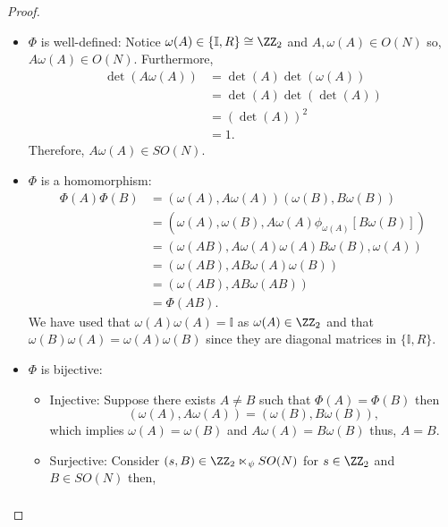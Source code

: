 \documentclass[12pt, a4paper]{article}
\begin{document}
\begin{proof}
\begin{enumerate}
\begin{itemize}
            \item \(\Phi\) is well-defined:
                    Notice \(\omega(A) \in \{\mathbb{I},R\} \cong \ZZ_2\) and \(A,\omega(A) \in O(N)\) so, \(A\omega(A) \in O(N)\). Furthermore, 
                    \[\begin{aligned}
                        \det(A\omega(A)) &= \det(A)\det(\omega(A)) \\
                        &= \det(A)\det(\det(A)) \\
                        &= (\det(A))^2 \\
                        &= 1.
                    \end{aligned}\]
                    Therefore, \(A\omega(A) \in SO(N)\).
            \item \(\Phi\) is a homomorphism:
                    \[\begin{aligned}
                        \Phi(A)\Phi(B) &=(\omega(A),A\omega(A))(\omega(B),B\omega(B)) \\
                        &= (\omega(A),\omega(B),A\omega(A)\phi_{\omega(A)}[B\omega(B)]) \\
                        &= (\omega(AB),A \omega(A)\omega(A)B\omega(B),\omega(A)) \\
                        &= (\omega(AB), AB \omega(A)\omega(B)) \\
                        &= (\omega(AB), AB\omega(AB)) \\
                        &= \Phi(AB).
                    \end{aligned}\]
                    We have used that \(\omega(A)\omega(A) = \mathbb{I}\) as \(\omega(A) \in \ZZ_2\) and that \(\omega(B)\omega(A)=\omega(A)\omega(B)\) since they are diagonal matrices in \(\{\mathbb{I},R\}\).
            \item \(\Phi\) is bijective:
                    \begin{itemize}
                        \item Injective: 
                        Suppose there exists \(A \neq B\) such that \(\Phi(A) = \Phi(B)\) then 
                        \[(\omega(A),A\omega(A))=(\omega(B),B\omega(B)),\]
                        which implies \(\omega(A)=\omega(B)\) and \(A\omega(A)=B\omega(B)\) thus, \(A=B\).
                        \item Surjective: Consider \((s,B) \in \ZZ_2 \ltimes_{\psi} SO(N)\) for \(s \in \ZZ_2\) and \(B \in SO(N)\) then,
                        \[\begin{aligned}

\end{aligned}\]
\end{itemize}
\end{itemize}
\end{enumerate}
\end{proof}
\end{document}
